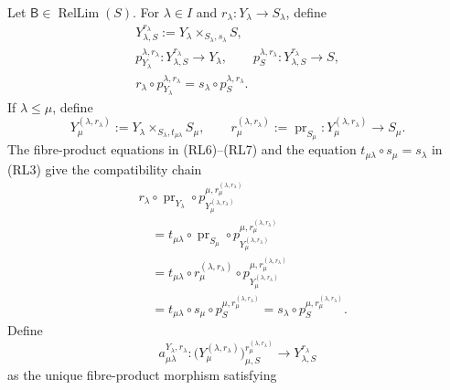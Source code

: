 \begin{definition}
  \label{def:nagata-relative-base-change-notation}

  Let \(\mathsf B\in\operatorname{RelLim}(S)\).  For
  \(\lambda\in I\) and \(r_\lambda\colon Y_\lambda\to S_\lambda\),
  define
  \[
  \begin{gathered}
    Y_{\lambda,S}^{r_\lambda}
      :=Y_\lambda\times_{S_\lambda,s_\lambda}S,\\
    p_{Y_\lambda}^{\lambda,r_\lambda}\colon
       Y_{\lambda,S}^{r_\lambda}\to Y_\lambda,\qquad
    p_S^{\lambda,r_\lambda}\colon
       Y_{\lambda,S}^{r_\lambda}\to S,\\
    r_\lambda\circ p_{Y_\lambda}^{\lambda,r_\lambda}
      =s_\lambda\circ p_S^{\lambda,r_\lambda}.
  \end{gathered}                                                    \tag{RL6}
  \]
  If \(\lambda\leq\mu\), define
  \[
    Y_\mu^{(\lambda,r_\lambda)}
      :=Y_\lambda\times_{S_\lambda,t_{\mu\lambda}}S_\mu,\qquad
    r_\mu^{(\lambda,r_\lambda)}
      :=\operatorname{pr}_{S_\mu}\colon
         Y_\mu^{(\lambda,r_\lambda)}\to S_\mu.                    \tag{RL7}
  \]
  The fibre-product equations in (RL6)--(RL7) and the equation
  \(t_{\mu\lambda}\circ s_\mu=s_\lambda\) in (RL3) give the
  compatibility chain
  \[
  \begin{aligned}
    &r_\lambda\circ\operatorname{pr}_{Y_\lambda}\circ
      p_{Y_\mu^{(\lambda,r_\lambda)}}^{
        \mu,r_\mu^{(\lambda,r_\lambda)}}\\
    &\quad=
      t_{\mu\lambda}\circ\operatorname{pr}_{S_\mu}\circ
      p_{Y_\mu^{(\lambda,r_\lambda)}}^{
        \mu,r_\mu^{(\lambda,r_\lambda)}}\\
    &\quad=
      t_{\mu\lambda}\circ r_\mu^{(\lambda,r_\lambda)}\circ
      p_{Y_\mu^{(\lambda,r_\lambda)}}^{
        \mu,r_\mu^{(\lambda,r_\lambda)}}\\
    &\quad=
      t_{\mu\lambda}\circ s_\mu\circ
      p_S^{\mu,r_\mu^{(\lambda,r_\lambda)}}
      =s_\lambda\circ
      p_S^{\mu,r_\mu^{(\lambda,r_\lambda)}}.
  \end{aligned}
  \]
  Define
  \[
    a_{\mu\lambda}^{Y_\lambda,r_\lambda}\colon
      \bigl(Y_\mu^{(\lambda,r_\lambda)}\bigr)_{
        \mu,S}^{r_\mu^{(\lambda,r_\lambda)}}
        \longrightarrow Y_{\lambda,S}^{r_\lambda}                 \tag{RL8}
  \]
  as the unique fibre-product morphism satisfying
  \[
  \begin{aligned}

\end{aligned}\]
\end{definition}
